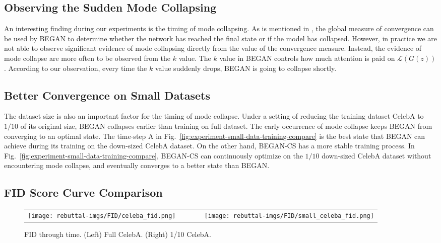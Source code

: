 \documentclass[runningheads]{llncs}
\begin{document}
    \subsection{Observing the Sudden Mode Collapsing}
    \label{subsection:SuddenModeCollapse}
    
    An interesting finding during our experiments is the timing of mode collapsing.
    As is mentioned in \cite{BEGAN}, the global measure of convergence can be used by BEGAN to determine whether the network has reached the final state or if the model has collapsed. However, in practice we are not able to observe significant evidence of mode collapsing directly from the value of the convergence measure. Instead, the evidence of mode collapse are more often to be observed from the $k$ value. The $k$ value in BEGAN controls how much attention is paid on $\mathcal{L}(G(z))$. According to our observation, every time the $k$ value suddenly drops, BEGAN is going to collapse shortly.
    
    
    \subsection{Better Convergence on Small Datasets}
    \label{subsection:better-convergence-on-small-dataset}
    
    The dataset size is also an important factor for the timing of mode collapse. Under a setting of reducing the training dataset CelebA to $1/10$ of its original size, BEGAN collapses earlier than training on full dataset. The early occurrence of mode collapse keeps BEGAN from converging to an optimal state. The time-step {\sf A} in Fig.~\ref{fig:experiment-small-data-training-compare} is the best state that BEGAN can achieve during its training on the down-sized CelebA dataset. On the other hand, BEGAN-CS has a more stable training process. In Fig.~\ref{fig:experiment-small-data-training-compare}, BEGAN-CS can continuously optimize on the $1/10$ down-sized CelebA dataset without encountering  mode collapse, and eventually converges to a better state than BEGAN.
    
    \subsection{FID Score Curve Comparison}
    
    \newlength{\oldintextsep}
    \setlength{\oldintextsep}{\intextsep}
    \setlength\intextsep{0pt}
    
    \begin{wrapfigure}[13]{r}{0.65\linewidth}
        \captionsetup{width=0.8\linewidth}
        \centering
        \begin{tabular}{C{0.5\linewidth}C{0.5\linewidth}}
             \texttt{[image: rebuttal-imgs/FID/celeba\_fid.png]} &
             \texttt{[image: rebuttal-imgs/FID/small\_celeba\_fid.png]}
        \end{tabular}
        \caption{FID through time. (Left) Full CelebA. (Right) 1/10 CelebA.}
        \label{Figure:FID_scores}
    \end{wrapfigure}
\end{document}
